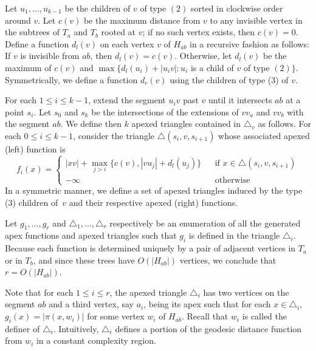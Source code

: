 \documentclass[a4paper,UKenglish]{lipics}
\newcommand{\g}[2]{\ensuremath{|\pi(#1, #2)|}}
\begin{document}
Let $u_1, \ldots, u_{k-1}$ be the children of $v$ of type $(2)$ sorted in clockwise order around $v$.
Let $c(v)$ be the maximum distance from $v$ to any invisible vertex in the subtrees of $T_a$ and $T_b$ rooted at $v$; if no such vertex exists, then $c(v) = 0$. 
Define a function $d_l(v)$ on each vertex $v$ of $H_{ab}$ in a recursive fashion as follows:
If $v$ is invisible from $ab$, then $d_l(v) = c(v)$. 
Otherwise, let $d_l(v)$ be the maximum of $c(v)$ and $\max\{d_l(u_i) + |u_iv| : u_i$ is a child of $v$ of type $(2)\}$.
Symmetrically, we define a function $d_r(v)$ using the children of type (3) of $v$.

For each $1\leq i\leq k-1$, extend the segment $u_iv$ past $v$ until it intersects $ab$ at a point $s_i$. Let $s_0$ and $s_k$ be the intersections of the extensions of $vv_a$ and $vv_b$ with the segment $ab$.
We define then $k$ apexed triangles contained in $\triangle_v$ as follows. 
For each $0\leq i\leq k-1$, consider the triangle $\triangle(s_i, v, s_{i+1})$ whose associated apexed (left) function is 
$$f_i(x) = \left\{ \begin{array}{lll}
|xv| + \max_{j>i}\{c(v), |vu_j| + d_l(u_j)\} && \text{if $x\in \triangle(s_i, v, s_{i+1})$}\\
-\infty&&\text{otherwise}
\end{array}\right.$$
In a symmetric manner, we define a set of apexed triangles induced by the type (3) children of~$v$ and their respective apexed (right) functions.

Let $g_1, \ldots, g_r$ and $\triangle_1, \ldots, \triangle_r$ respectively be an enumeration of all the generated apex functions and apexed triangles such that $g_i$ is defined in the triangle $\triangle_i$. Because each function is determined uniquely by a pair of adjacent vertices in $T_a$ or in $T_b$, and since these trees have $O(|H_{ab}|)$ vertices, we conclude that $r = O(|H_{ab}|)$. 

Note that for each $1\leq i\leq r$, the apexed triangle $\triangle_i$ has two vertices on the segment $ab$ and a third vertex, say $a_i$, being its apex such that for each $x\in \triangle_i$, $g_i(x) = \g{x}{w_i}$ for some vertex $w_i$ of $H_{ab}$. Recall that $w_i$ is called the definer of $\triangle_i$. Intuitively, $\triangle_i$ defines a portion of the geodesic distance function from $w_i$ in a constant complexity region. 
\end{document}
